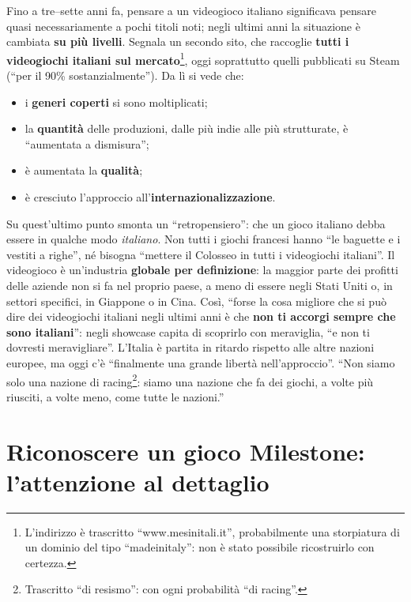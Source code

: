 Fino a tre--sette anni fa, pensare a un videogioco italiano significava pensare
quasi necessariamente a pochi titoli noti; negli ultimi anni la situazione è
cambiata \textbf{su più livelli}. Segnala un secondo sito, che raccoglie
\textbf{tutti i videogiochi italiani sul mercato}\footnote{L'indirizzo è
trascritto ``www.mesinitali.it'', probabilmente una storpiatura di un dominio
del tipo ``madeinitaly'': non è stato possibile ricostruirlo con certezza.}, oggi
soprattutto quelli pubblicati su Steam (``per il 90\% sostanzialmente''). Da lì
si vede che:
\begin{itemize}
  \item i \textbf{generi coperti} si sono moltiplicati;
  \item la \textbf{quantità} delle produzioni, dalle più indie alle più
        strutturate, è ``aumentata a dismisura'';
  \item è aumentata la \textbf{qualità};
  \item è cresciuto l'approccio all'\textbf{internazionalizzazione}.
\end{itemize}

Su quest'ultimo punto smonta un ``retropensiero'': che un gioco italiano debba
essere in qualche modo \emph{italiano}. Non tutti i giochi francesi hanno
``le baguette e i vestiti a righe'', né bisogna ``mettere il Colosseo in tutti i
videogiochi italiani''. Il videogioco è un'industria \textbf{globale per
definizione}: la maggior parte dei profitti delle aziende non si fa nel proprio
paese, a meno di essere negli Stati Uniti o, in settori specifici, in Giappone o
in Cina. Così, ``forse la cosa migliore che si può dire dei videogiochi italiani
negli ultimi anni è che \textbf{non ti accorgi sempre che sono italiani}'': negli
showcase capita di scoprirlo con meraviglia, ``e non ti dovresti meravigliare''.
L'Italia è partita in ritardo rispetto alle altre nazioni europee, ma oggi
c'è ``finalmente una grande libertà nell'approccio''. ``Non siamo solo una
nazione di racing\footnote{Trascritto ``di resismo'': con ogni probabilità
``di racing''.}: siamo una nazione che fa dei giochi, a volte più riusciti, a
volte meno, come tutte le nazioni.''

\section{Riconoscere un gioco Milestone: l'attenzione al dettaglio}
\label{sec:c1-1-dettaglio}

